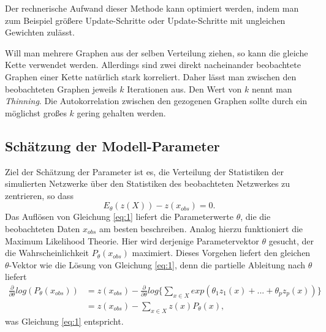 \documentclass[a4paper,ngerman,oneside,titlepage,bibliography=totoc,11pt]{scrreprt}
\begin{document}
Der rechnerische Aufwand dieser Methode kann optimiert werden, indem man zum Beispiel größere Update-Schritte oder Update-Schritte mit ungleichen Gewichten zulässt.

Will man mehrere Graphen aus der selben Verteilung ziehen, so kann die gleiche Kette verwendet werden. Allerdings sind zwei direkt nacheinander beobachtete Graphen einer Kette natürlich stark korreliert. Daher lässt man zwischen den beobachteten Graphen jeweils $k$ Iterationen aus. Den Wert von $k$ nennt man \emph{Thinning}. Die Autokorrelation zwischen den gezogenen Graphen sollte durch ein möglichst großes $k$ gering gehalten werden.

\subsection{Schätzung der Modell-Parameter}
\label{sec:modpar}
Ziel der Schätzung der Parameter ist es, die Verteilung der Statistiken der simulierten Netzwerke über den Statistiken des beobachteten Netzwerkes zu zentrieren, so dass
\begin{equation}
	E_\theta(z(X)) - z(x_{obs}) = 0.
	\label{eq:1}
\end{equation}
Das Auflösen von Gleichung \ref{eq:1} liefert die Parameterwerte $\theta$, die die beobachteten Daten $x_{obs}$ am besten beschreiben.
Analog hierzu funktioniert die Maximum Likelihood Theorie. Hier wird derjenige Parametervektor $\theta$ gesucht, der die Wahrscheinlichkeit $P_\theta(x_{obs})$ maximiert. Dieses Vorgehen liefert den gleichen $\theta$-Vektor wie die Lösung von Gleichung \ref{eq:1}, denn die partielle Ableitung nach $\theta$ liefert
\begin{align*}
\frac{\partial}{\partial \theta} log(P_\theta(x_{obs})) &= z(x_{obs}) - \frac{\partial}{\partial \theta} log\{\sum_{x \in X}{exp(\theta_1z_1(x)+ ... + \theta_pz_p(x))}\}\\
&=z(x_{obs}) - \sum_{x \in X}{z(x)P_\theta(x)},
\end{align*}
was Gleichung \ref{eq:1} entspricht. 
\end{document}
